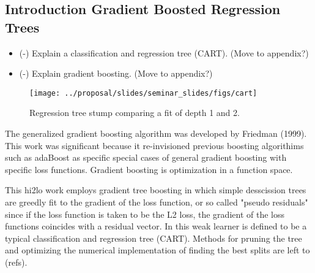 \subsection{Introduction Gradient Boosted Regression Trees}
\begin{itemize}
    \item (\checkmark-) Explain a classification and regression tree (CART).  (Move to appendix?)
    \item (\checkmark-) Explain gradient boosting.  (Move to appendix?)
\end{itemize}

\begin{figure}[H]
    \centering
    \texttt{[image: ../proposal/slides/seminar\_slides/figs/cart]}
    \caption[Regression tree stump.]{Regression tree stump comparing a fit of depth 1 and 2.}
    \label{fig:cart}
\end{figure}

The generalized gradient boosting algorithm was developed by Friedman (1999).  This work was significant because it re-invisioned previous boosting algorithims such as adaBoost as specific special cases of general gradient boosting with specific loss functions.  Gradient boosting is optimization in a function space.

This hi2lo work employs gradient tree boosting in which simple desscission trees are greedly fit to the gradient of the loss function, or so called "pseudo residuals" since if the loss function is taken to be the L2 loss, the gradient of the loss functions coincides with a residual vector.  In this  weak learner is defined to be a typical classification and regression tree (CART).  Methods for pruning the tree and optimizing the numerical implementation of finding the best splits are left to (refs).

